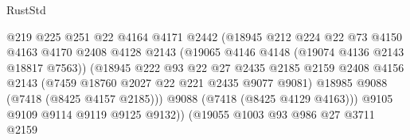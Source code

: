 \begin{lexlean}{RustStd}
\begin{coremodule}
                                            @219
                                            @225
                                            @251
                                            @22
                                            @4164
                                            @4171
                                            @2442
                                            (@18945
                                              @212
                                              @224
                                              @22
                                              @73
                                              @4150
                                              @4163
                                              @4170
                                              @2408
                                              @4128
                                              @2143
                                              (@19065 @4146 @4148 (@19074 @4136 @2143 @18817 @7563))
                                              (@18945
                                                @222
                                                @93
                                                @22
                                                @27
                                                @2435
                                                @2185
                                                @2159
                                                @2408
                                                @4156
                                                @2143
                                                (@7459 @18760 @2027 @22 @221 @2435 @9077 @9081)
                                                @18985
                                                @9088
                                                (@7418 (@8425 @4157 @2185)))
                                              @9088
                                              (@7418 (@8425 @4129 @4163)))
                                            @9105
                                            @9109
                                            @9114
                                            @9119
                                            @9125
                                            @9132))
                                        (@19055
                                          @1003
                                          @93
                                          @986
                                          @27
                                          @3711
                                          @2159

\end{coremodule}
\end{lexlean}
